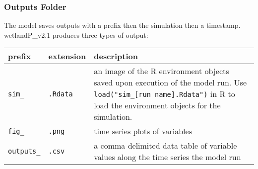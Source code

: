 \documentclass[
]{article}
\begin{document}
\hypertarget{outputs-folder}{%
\subsubsection{Outputs Folder}\label{outputs-folder}}

The model saves outputs with a prefix then the simulation then a
timestamp. wetlandP\_v2.1 produces three types of output:

\begin{longtable}[]{@{}lll@{}}
\toprule
\begin{minipage}[b]{0.30\columnwidth}\raggedright
prefix\strut
\end{minipage} & \begin{minipage}[b]{0.30\columnwidth}\raggedright
extension\strut
\end{minipage} & \begin{minipage}[b]{0.30\columnwidth}\raggedright
description\strut
\end{minipage}\tabularnewline
\midrule
\endhead
\begin{minipage}[t]{0.30\columnwidth}\raggedright
\texttt{sim\_}\strut
\end{minipage} & \begin{minipage}[t]{0.30\columnwidth}\raggedright
\texttt{.Rdata}\strut
\end{minipage} & \begin{minipage}[t]{0.30\columnwidth}\raggedright
an image of the R environment objects saved upon execution of the model
run. Use \texttt{load("sim\_{[}run\ name{]}.Rdata")} in R to load the
environment objects for the simulation.\strut
\end{minipage}\tabularnewline
\begin{minipage}[t]{0.30\columnwidth}\raggedright
\texttt{fig\_}\strut
\end{minipage} & \begin{minipage}[t]{0.30\columnwidth}\raggedright
\texttt{.png}\strut
\end{minipage} & \begin{minipage}[t]{0.30\columnwidth}\raggedright
time series plots of variables\strut
\end{minipage}\tabularnewline
\begin{minipage}[t]{0.30\columnwidth}\raggedright
\texttt{outputs\_}\strut
\end{minipage} & \begin{minipage}[t]{0.30\columnwidth}\raggedright
\texttt{.csv}\strut
\end{minipage} & \begin{minipage}[t]{0.30\columnwidth}\raggedright
a comma delimited data table of variable values along the time series
the model run\strut
\end{minipage}\tabularnewline
\bottomrule
\end{longtable}
\end{document}
